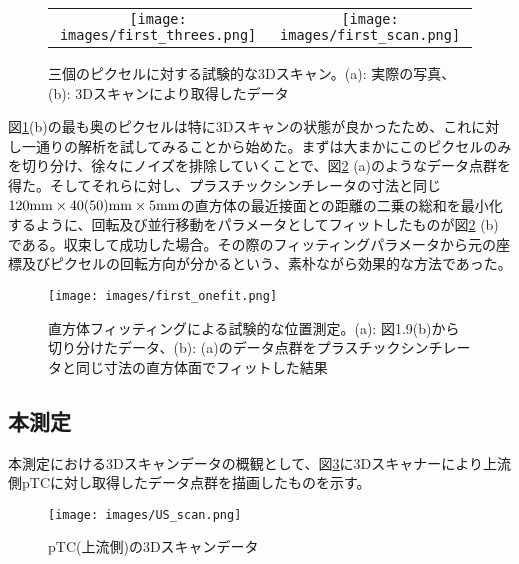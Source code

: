 \documentclass[Yonemoto_master.tex]{subfiles}
\begin{document}
\begin{figure}[h]
    \begin{tabular}{cc}
      \begin{minipage}[t]{0.45\hsize}
        \centering
        \texttt{[image: images/first\_threes.png]}
        \caption*{(a)}
      \end{minipage} &
      \begin{minipage}[t]{0.45\hsize}
        \centering
        \texttt{[image: images/first\_scan.png]}
        \caption*{(b)}
      \end{minipage}
    \end{tabular}
    \caption{三個のピクセルに対する試験的な3Dスキャン。(a): 実際の写真、(b): 3Dスキャンにより取得したデータ}
    \label{fig: first_scan}
  \end{figure}
図\ref{fig: first_scan}(b)の最も奥のピクセルは特に3Dスキャンの状態が良かったため、これに対し一通りの解析を試してみることから始めた。まずは大まかにこのピクセルのみを切り分け、徐々にノイズを排除していくことで、図\ref{fig: first_fit} (a)のようなデータ点群を得た。そしてそれらに対し、プラスチックシンチレータの寸法と同じ$120 {\rm mm} \times 40 (50){\rm mm} \times 5 {\rm mm}$の直方体の最近接面との距離の二乗の総和を最小化するように、回転及び並行移動をパラメータとしてフィットしたものが図\ref{fig: first_fit} (b)である。収束して成功した場合。その際のフィッティングパラメータから元の座標及びピクセルの回転方向が分かるという、素朴ながら効果的な方法であった。
 
\begin{figure}
    \centering
    \texttt{[image: images/first\_onefit.png]}
    \caption{直方体フィッティングによる試験的な位置測定。(a): 図1.9(b)から切り分けたデータ、(b): (a)のデータ点群をプラスチックシンチレータと同じ寸法の直方体面でフィットした結果}
    \label{fig: first_fit}
\end{figure}
  
\subsection{本測定}
本測定における3Dスキャンデータの概観として、図\ref{fig: US_scan}に3Dスキャナーにより上流側pTCに対し取得したデータ点群を描画したものを示す。

\begin{figure}[h]
\begin{center}
\texttt{[image: images/US\_scan.png]}
\caption{pTC(上流側)の3Dスキャンデータ}
\label{fig: US_scan}
\end{center}
\end{figure}
\end{document}
